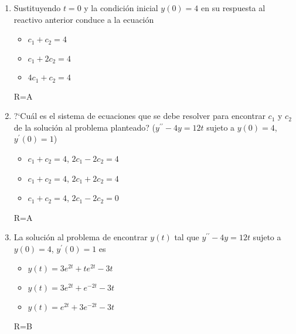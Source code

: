 \documentclass[12pt]{article}
\def\TresOp#1#2#3{
\begin{itemize}
\item[A)] #1
\item[B)] #2
\item[C)] #3
\end{itemize}
}
\begin{document}
\begin{enumerate}
\newpage
\item Sustituyendo $t=0$ y la condición inicial $y(0)=4$ en su respuesta al reactivo anterior 
conduce a la ecuación
\TresOp{$c_{1}+c_{2}=4$}
{$c_{1}+2c_{2}=4$}
{$4c_{1}+c_{2}=4$}
{\tiny R=A}
\item ?`Cuál es el sistema de ecuaciones que se debe resolver para encontrar $c_{1}$ y $c_{2}$ 
de la solución al problema planteado? ($y^{\prime\prime}-4y=12t$ sujeto a $y(0)=4$, 
$y^{\prime}(0)=1$)
\TresOp{$c_{1}+c_{2}=4$, $2c_{1}-2c_{2}=4$}
{$c_{1}+c_{2}=4$, $2c_{1}+2c_{2}=4$}
{$c_{1}+c_{2}=4$, $2c_{1}-2c_{2}=0$}
{\tiny R=A}
\item La solución al problema de encontrar $y(t)$ tal que 
$y^{\prime\prime}-4y=12t$ sujeto a $y(0)=4$, $y^{\prime}(0)=1$ es
\TresOp{$y(t)=3e^{2t}+te^{2t}-3t$}
{$y(t)=3e^{2t}+e^{-2t}-3t$}
{$y(t)=e^{2t}+3e^{-2t}-3t$}
{\tiny R=B}
\end{enumerate}
\end{document}
